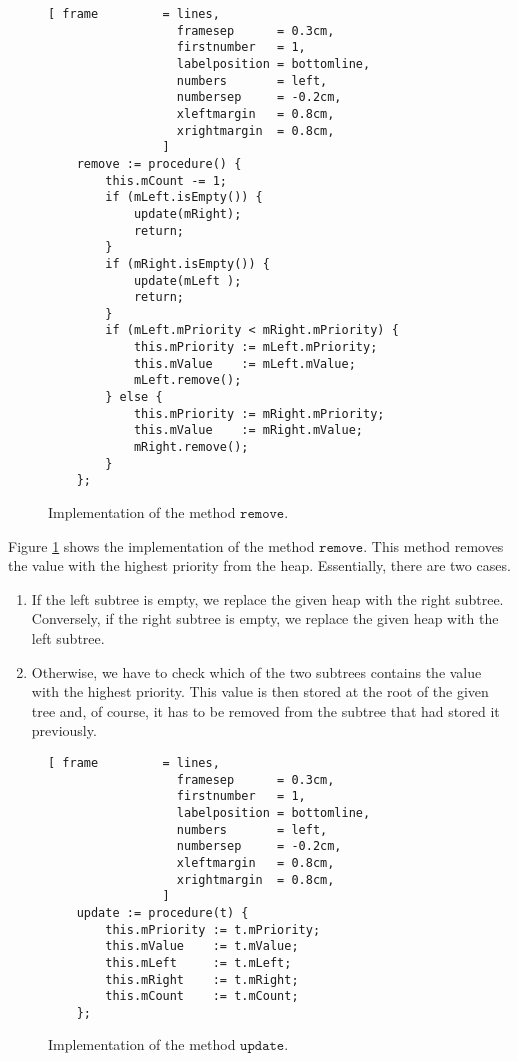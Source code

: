 \begin{figure}[!ht]
\centering
\begin{Verbatim}[ frame         = lines, 
                  framesep      = 0.3cm, 
                  firstnumber   = 1,
                  labelposition = bottomline,
                  numbers       = left,
                  numbersep     = -0.2cm,
                  xleftmargin   = 0.8cm,
                  xrightmargin  = 0.8cm,
                ]
    remove := procedure() {
        this.mCount -= 1;
        if (mLeft.isEmpty()) { 
            update(mRight); 
            return;
        } 
        if (mRight.isEmpty()) { 
            update(mLeft ); 
            return;
        }
        if (mLeft.mPriority < mRight.mPriority) {
            this.mPriority := mLeft.mPriority;
            this.mValue    := mLeft.mValue;
            mLeft.remove();
        } else {
            this.mPriority := mRight.mPriority;
            this.mValue    := mRight.mValue;
            mRight.remove();
        }
    };
\end{Verbatim}
\vspace*{-0.3cm}
\caption{Implementation of the method $\texttt{remove}$.}
\label{fig:heap.stlx-remove}
\end{figure}

\noindent
Figure \ref{fig:heap.stlx-remove} shows the implementation of the method $\texttt{remove}$.  This
method removes the value with the highest priority from the heap.  Essentially, there are two
cases.
\begin{enumerate}
\item If the left subtree is empty, we replace the given heap with the right subtree. 
      Conversely, if the right subtree is empty, we replace the given heap with the  left subtree.
\item Otherwise, we have to check which of the two subtrees contains the value with the highest
      priority.  This value is then stored at the root of the given tree and, of course,
      it has to be removed from the subtree that had stored it previously.
\end{enumerate}

\begin{figure}[!ht]
\centering
\begin{Verbatim}[ frame         = lines, 
                  framesep      = 0.3cm, 
                  firstnumber   = 1,
                  labelposition = bottomline,
                  numbers       = left,
                  numbersep     = -0.2cm,
                  xleftmargin   = 0.8cm,
                  xrightmargin  = 0.8cm,
                ]
    update := procedure(t) {
        this.mPriority := t.mPriority;
        this.mValue    := t.mValue;
        this.mLeft     := t.mLeft;
        this.mRight    := t.mRight;
        this.mCount    := t.mCount;
    };      
\end{Verbatim}
\vspace*{-0.3cm}
\caption{Implementation of the method $\texttt{update}$.}
\label{fig:heap.stlx-update}
\end{figure}


